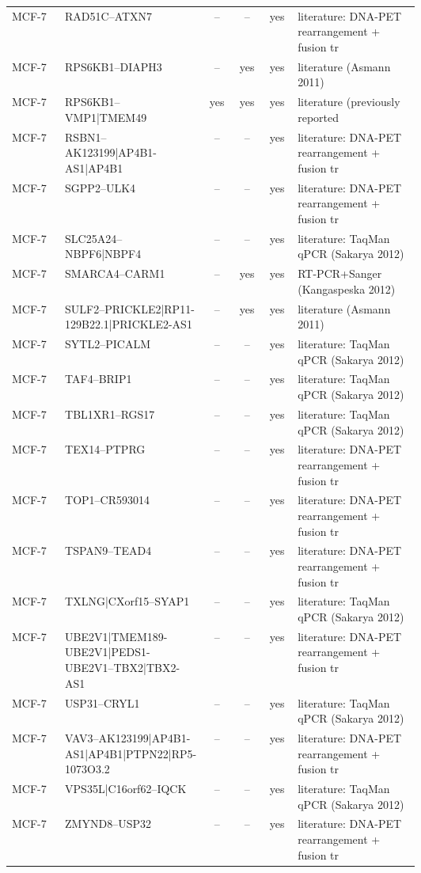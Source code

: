 {\begin{longtable}{lp{0.30\linewidth}cccp{0.30\linewidth}}
MCF-7 & RAD51C--ATXN7 & -- & -- & yes & literature: DNA-PET rearrangement + fusion tr \\
MCF-7 & RPS6KB1--DIAPH3 & -- & yes & yes & literature (Asmann 2011) \\
MCF-7 & RPS6KB1--VMP1|TMEM49 & yes & yes & yes & literature (previously reported \\
MCF-7 & RSBN1--AK123199|AP4B1-AS1|AP4B1 & -- & -- & yes & literature: DNA-PET rearrangement + fusion tr \\
MCF-7 & SGPP2--ULK4 & -- & -- & yes & literature: DNA-PET rearrangement + fusion tr \\
MCF-7 & SLC25A24--NBPF6|NBPF4 & -- & -- & yes & literature: TaqMan qPCR (Sakarya 2012) \\
MCF-7 & SMARCA4--CARM1 & -- & yes & yes & RT-PCR+Sanger (Kangaspeska 2012) \\
MCF-7 & SULF2--PRICKLE2|RP11-129B22.1|PRICKLE2-AS1 & -- & yes & yes & literature (Asmann 2011) \\
MCF-7 & SYTL2--PICALM & -- & -- & yes & literature: TaqMan qPCR (Sakarya 2012) \\
MCF-7 & TAF4--BRIP1 & -- & -- & yes & literature: TaqMan qPCR (Sakarya 2012) \\
MCF-7 & TBL1XR1--RGS17 & -- & -- & yes & literature: TaqMan qPCR (Sakarya 2012) \\
MCF-7 & TEX14--PTPRG & -- & -- & yes & literature: DNA-PET rearrangement + fusion tr \\
MCF-7 & TOP1--CR593014 & -- & -- & yes & literature: DNA-PET rearrangement + fusion tr \\
MCF-7 & TSPAN9--TEAD4 & -- & -- & yes & literature: DNA-PET rearrangement + fusion tr \\
MCF-7 & TXLNG|CXorf15--SYAP1 & -- & -- & yes & literature: TaqMan qPCR (Sakarya 2012) \\
MCF-7 & UBE2V1|TMEM189-UBE2V1|PEDS1-UBE2V1--TBX2|TBX2-AS1 & -- & -- & yes & literature: DNA-PET rearrangement + fusion tr \\
MCF-7 & USP31--CRYL1 & -- & -- & yes & literature: TaqMan qPCR (Sakarya 2012) \\
MCF-7 & VAV3--AK123199|AP4B1-AS1|AP4B1|PTPN22|RP5-1073O3.2 & -- & -- & yes & literature: DNA-PET rearrangement + fusion tr \\
MCF-7 & VPS35L|C16orf62--IQCK & -- & -- & yes & literature: TaqMan qPCR (Sakarya 2012) \\
MCF-7 & ZMYND8--USP32 & -- & -- & yes & literature: DNA-PET rearrangement + fusion tr \\

\end{longtable}}
